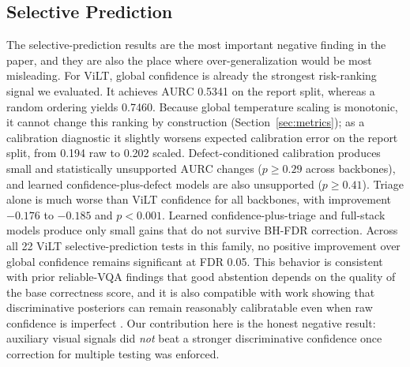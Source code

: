 \documentclass{ieeeaccess}
\newcommand{\aurc}{\mathrm{AURC}}
\newcommand{\vilt}{ViLT}
\begin{document}
\subsection{Selective Prediction}
The selective-prediction results are the most important negative finding in the paper, and they are also the place where over-generalization would be most misleading. For \vilt{}, global confidence is already the strongest risk-ranking signal we evaluated. It achieves $\aurc$ 0.5341 on the report split, whereas a random ordering yields 0.7460.
Because global temperature scaling is monotonic, it cannot change this ranking by construction (Section~\ref{sec:metrics}); as a calibration diagnostic it slightly worsens expected calibration error on the report split, from 0.194 raw to 0.202 scaled. Defect-conditioned calibration produces small and statistically unsupported $\aurc$ changes ($p \geq 0.29$ across backbones), and learned confidence-plus-defect models are also unsupported ($p \geq 0.41$). Triage alone is much worse than \vilt{} confidence for all backbones, with improvement $-0.176$ to $-0.185$ and $p<0.001$. Learned confidence-plus-triage and full-stack models produce only small gains that do not survive BH-FDR correction.
Across all 22 \vilt{} selective-prediction tests in this family, no positive improvement over global confidence remains significant at FDR 0.05. This behavior is consistent with prior reliable-VQA findings that good abstention depends on the quality of the base correctness score, and it is also compatible with work showing that discriminative posteriors can remain reasonably calibratable even when raw confidence is imperfect \cite{whitehead2022reliable,dancette2023improving,khan2024consistency,srinivasan2024selective,guo2017calibration,desai2020calibration}. Our contribution here is the honest negative result: auxiliary visual signals did \emph{not} beat a stronger discriminative confidence once correction for multiple testing was enforced.
\end{document}

